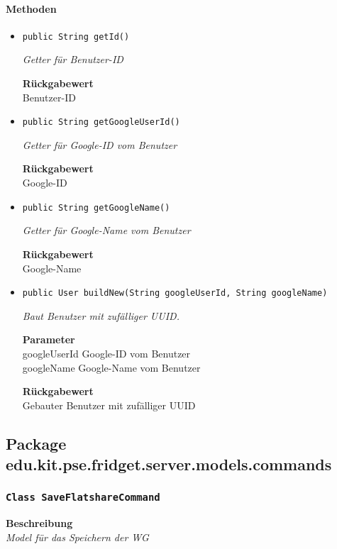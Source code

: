      \paragraph*{Methoden}
     \begin{itemize}
     	\item{\texttt{public String getId()}}
     	
     	\textit{Getter für Benutzer-ID}
     	
     	
     	
     	\textbf{Rückgabewert} \\
     	Benutzer-ID        \item{\texttt{public String getGoogleUserId()}}
     	
     	\textit{Getter für Google-ID vom Benutzer}
     	
     	
     	
     	\textbf{Rückgabewert} \\
     	Google-ID        \item{\texttt{public String getGoogleName()}}
     	
     	\textit{Getter für Google-Name vom Benutzer}
     	
     	
     	
     	\textbf{Rückgabewert} \\
     	Google-Name        \item{\texttt{public User buildNew(String googleUserId, String googleName)}}
     	
     	\textit{Baut Benutzer mit zufälliger UUID.}
     	
     	\textbf{Parameter} \\
     	googleUserId Google-ID vom Benutzer\\
     	googleName Google-Name vom Benutzer
     	
     	\textbf{Rückgabewert} \\
     	Gebauter Benutzer mit zufälliger UUID
     \end{itemize}
     \subsection{Package edu.kit.pse.fridget.server.models.commands}
     \subsubsection{\texttt{Class SaveFlatshareCommand}}
     \textbf{Beschreibung} \\
     \textit{Model für das Speichern der WG}
